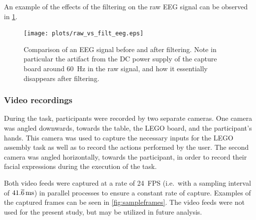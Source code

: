 \documentclass[10pt,letterpaper]{article}
\begin{document}
An example of the effects of the filtering on the raw EEG signal can be observed in \cref{fig:eeg:raw_vs_filt}.

\begin{figure}[h]
  \centering
  \texttt{[image: plots/raw\_vs\_filt\_eeg.eps]}
  \caption{Comparison of an EEG signal before and after filtering.
  Note in particular the artifact from the DC power supply of the capture board around \SI{60}{\hertz} in the raw signal, and how it essentially disappears after filtering.}%
  \label{fig:eeg:raw_vs_filt}
\end{figure}

\subsubsection{Video recordings}

During the task, participants were recorded by two separate cameras.
One camera was angled downwards, towards the table, the LEGO board, and the participant's hands.
This camera was used to capture the necessary inputs for the LEGO assembly task as well as to record the actions performed by the user.
The second camera was angled horizontally, towards the participant, in order to record their facial expressions during the execution of the task.

Both video feeds were captured at a rate of \num{24}~FPS (i.e.\ with a sampling interval of \( \SI[parse-numbers=false,per-mode=symbol]{41.\overline{6}}{\milli\second} \)) in parallel processes to ensure a constant rate of capture.
Examples of the captured frames can be seen in \cref{fig:sampleframes}.
The video feeds were not used for the present study, but may be utilized in future analysis.
\end{document}
